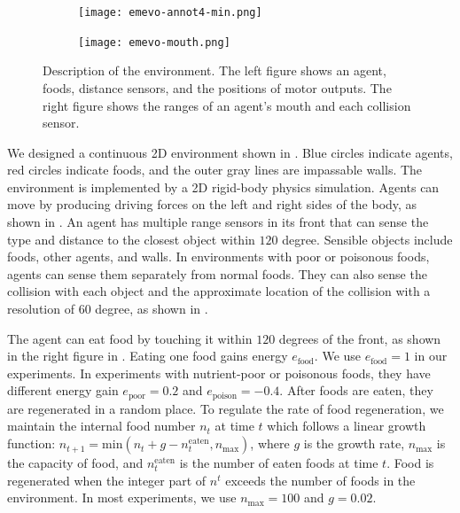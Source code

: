 \begin{figure}[t]
  \begin{subfigure}[t]{4.5cm}
    \centering
    \texttt{[image: emevo-annot4-min.png]}
  \end{subfigure}
  \begin{subfigure}[t]{3.5cm}
    \centering
    \texttt{[image: emevo-mouth.png]}
  \end{subfigure}
  \caption{
    Description of the environment.
    The left figure shows an agent, foods, distance sensors, and the positions of motor outputs.
    The right figure shows the ranges of an agent's mouth and each collision sensor.
  }\label{figure:env-discr}
\end{figure}

We designed a continuous 2D environment shown in . Blue circles indicate agents, red circles indicate foods, and the outer gray lines are impassable walls. The environment is implemented by a 2D rigid-body physics simulation. Agents can move by producing driving forces on the left and right sides of the body, as shown in . An agent has multiple range sensors in its front that can sense the type and distance to the closest object within $120$ degree. Sensible objects include foods, other agents, and walls. In environments with poor or poisonous foods, agents can sense them separately from normal foods. They can also sense the collision with each object and the approximate location of the collision with a resolution of $60$ degree, as shown in .

The agent can eat food by touching it within $120$ degrees of the front, as shown in the right figure in . Eating one food gains energy $e_{\mathrm{food}}$. We use $e_{\mathrm{food}} = 1$ in our experiments. In experiments with nutrient-poor or poisonous foods, they have different energy gain $e_{\mathrm{poor}} = 0.2$ and $e_{\mathrm{poison}} = -0.4$. After foods are eaten, they are regenerated in a random place. To regulate the rate of food regeneration, we maintain the internal food number $n_{t}$ at time $t$ which follows a linear growth function: $n_{t + 1} = \textrm{min}(n_{t} + g - n_{t}^{\mathrm{eaten}}, n_{\mathrm{max}})$, where $g$ is the growth rate, $n_{\mathrm{max}}$ is the capacity of food, and $n_{t}^{\mathrm{eaten}}$ is the number of eaten foods at time $t$. Food is regenerated when the integer part of $n^{t}$ exceeds the number of foods in the environment. In most experiments, we use $n_{\mathrm{max}} = 100$ and $g = 0.02$.

